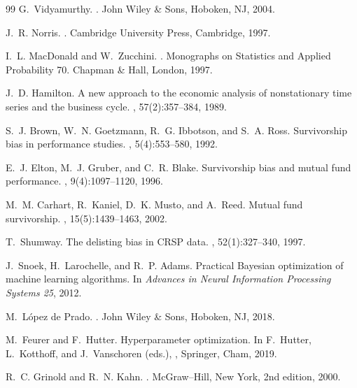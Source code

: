 \documentclass[11pt,a4paper]{article}
\begin{document}
\begin{thebibliography}{99}
G.~Vidyamurthy.
.
\newblock John Wiley \& Sons, Hoboken, NJ, 2004.

J.~R. Norris.
.
\newblock Cambridge University Press, Cambridge, 1997.

I.~L. MacDonald and W.~Zucchini.
.
\newblock Monographs on Statistics and Applied Probability 70. Chapman \& Hall, London, 1997.

J.~D. Hamilton.
\newblock A new approach to the economic analysis of nonstationary time series and the business cycle.
, 57(2):357--384, 1989.

S.~J. Brown, W.~N. Goetzmann, R.~G. Ibbotson, and S.~A. Ross.
\newblock Survivorship bias in performance studies.
, 5(4):553--580, 1992.

E.~J. Elton, M.~J. Gruber, and C.~R. Blake.
\newblock Survivorship bias and mutual fund performance.
, 9(4):1097--1120, 1996.

M.~M. Carhart, R.~Kaniel, D.~K. Musto, and A.~Reed.
\newblock Mutual fund survivorship.
, 15(5):1439--1463, 2002.

T.~Shumway.
\newblock The delisting bias in {CRSP} data.
, 52(1):327--340, 1997.

J.~Snoek, H.~Larochelle, and R.~P. Adams.
\newblock Practical {B}ayesian optimization of machine learning algorithms.
\newblock In {\em Advances in Neural Information Processing Systems 25}, 2012.

M.~L{\'o}pez de Prado.
.
\newblock John Wiley \& Sons, Hoboken, NJ, 2018.

M.~Feurer and F.~Hutter.
\newblock Hyperparameter optimization.
\newblock In F.~Hutter, L.~Kotthoff, and J.~Vanschoren (eds.),
,
\newblock Springer, Cham, 2019.

R.~C. Grinold and R.~N. Kahn.
.
\newblock McGraw--Hill, New York, 2nd edition, 2000.


\end{thebibliography}
\end{document}
